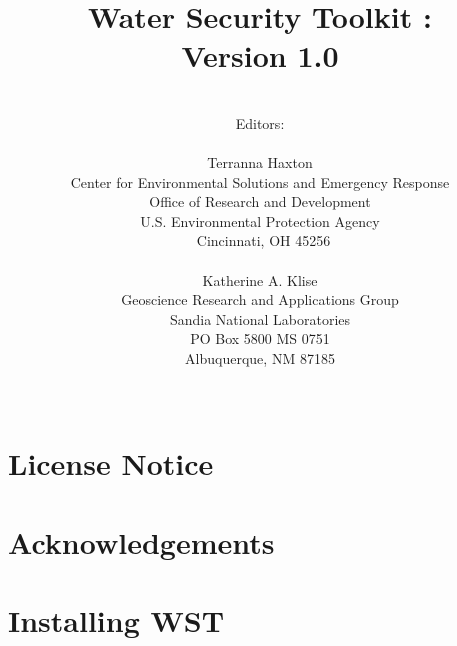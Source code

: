 \documentclass[pdf,oneside]{book}
\title{\sc Water Security Toolkit \docTitle:\\Version 1.0}
\author{\\Editors:\\
\\
Terranna Haxton\\
Center for Environmental Solutions and Emergency Response\\
Office of Research and Development\\
U.S. Environmental Protection Agency\\\
Cincinnati, OH 45256\\
\\
Katherine A. Klise\\
Geoscience Research and Applications Group\\
Sandia National Laboratories \\
PO Box 5800 MS 0751 \\
Albuquerque, NM 87185 \\
\\
  }
\date{}
\begin{document}
  
  \maketitle

  \clearpage
  
  

  \clearpage
  \chapter*{License Notice}
  

  \clearpage
  \chapter*{Acknowledgements}
  

  \cleardoublepage
  \tableofcontents

  \clearpage

  \chapter{Installing WST}
  

  \newpage

  

  \newpage

  

  
\end{document}
